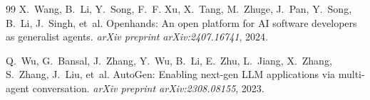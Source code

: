 \documentclass[11pt]{article}
\begin{document}
\begin{thebibliography}{99}
X.~Wang, B.~Li, Y.~Song, F.~F. Xu, X.~Tang, M.~Zhuge, J.~Pan, Y.~Song,
  B.~Li, J.~Singh, et~al.
\newblock Openhands: An open platform for AI software developers as generalist
  agents.
\newblock \emph{arXiv preprint arXiv:2407.16741}, 2024.

Q.~Wu, G.~Bansal, J.~Zhang, Y.~Wu, B.~Li, E.~Zhu, L.~Jiang, X.~Zhang,
  S.~Zhang, J.~Liu, et~al.
\newblock AutoGen: Enabling next-gen LLM applications via multi-agent
  conversation.
\newblock \emph{arXiv preprint arXiv:2308.08155}, 2023.

\end{thebibliography}
\end{document}
